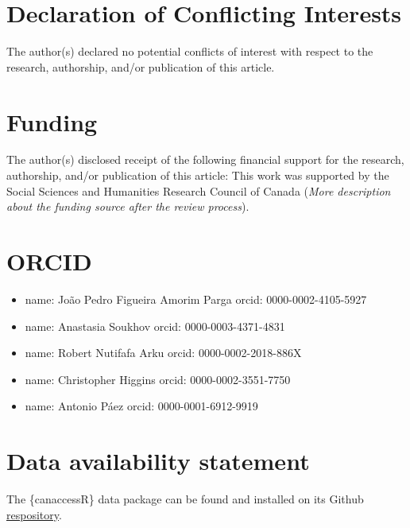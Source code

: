 \documentclass[Royal,times,sageh]{sagej}
\providecommand{\tightlist}{%
  \setlength{\itemsep}{0pt}\setlength{\parskip}{0pt}}
\begin{document}
\section{Declaration of Conflicting
Interests}\label{declaration-of-conflicting-interests}

The author(s) declared no potential conflicts of interest with respect
to the research, authorship, and/or publication of this article.

\section{Funding}\label{funding}

The author(s) disclosed receipt of the following financial support for
the research, authorship, and/or publication of this article: This work
was supported by the Social Sciences and Humanities Research Council of
Canada (\emph{More description about the funding source after the review
process}).

\section{ORCID}\label{orcid}

\begin{itemize}
\tightlist
\item
  name: João Pedro Figueira Amorim Parga orcid: 0000-0002-4105-5927
\item
  name: Anastasia Soukhov orcid: 0000-0003-4371-4831
\item
  name: Robert Nutifafa Arku orcid: 0000-0002-2018-886X
\item
  name: Christopher Higgins orcid: 0000-0002-3551-7750
\item
  name: Antonio Páez orcid: 0000-0001-6912-9919
\end{itemize}

\section{Data availability statement}\label{data-availability-statement}

The \{canaccessR\} data package can be found and installed on its Github
\href{https://github.com/paezha/canaccessR}{respository}.



\end{document}
